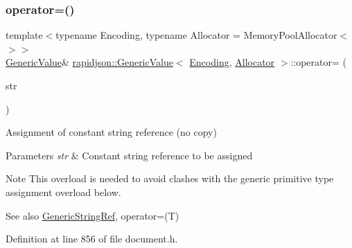 \subsubsection{\texorpdfstring{operator=()}{operator=()}\hspace{0.1cm}{\footnotesize\ttfamily [2/2]}}
{\footnotesize\ttfamily template$<$typename Encoding, typename Allocator = Memory\+Pool\+Allocator$<$$>$$>$ \\
\mbox{\hyperlink{classrapidjson_1_1_generic_value}{Generic\+Value}}\& \mbox{\hyperlink{classrapidjson_1_1_generic_value}{rapidjson\+::\+Generic\+Value}}$<$ \mbox{\hyperlink{classrapidjson_1_1_encoding}{Encoding}}, \mbox{\hyperlink{classrapidjson_1_1_allocator}{Allocator}} $>$\+::operator= (\begin{DoxyParamCaption}\item[{\mbox{\hyperlink{classrapidjson_1_1_generic_value_a559eb9cea54364a35518b02f6d74f379}{String\+Ref\+Type}}}]{str }\end{DoxyParamCaption})}



Assignment of constant string reference (no copy) 


\begin{DoxyParams}{Parameters}
{\em str} & Constant string reference to be assigned \\
\hline
\end{DoxyParams}
\begin{DoxyNote}{Note}
This overload is needed to avoid clashes with the generic primitive type assignment overload below. 
\end{DoxyNote}
\begin{DoxySeeAlso}{See also}
\mbox{\hyperlink{structrapidjson_1_1_generic_string_ref}{Generic\+String\+Ref}}, operator=(\+T) 
\end{DoxySeeAlso}


Definition at line 856 of file document.\+h.


\begin{DoxyCode}{0}

\end{DoxyCode}
\mbox{\label{classrapidjson_1_1_generic_value_a5490b1fdb725744a6defb14ed7c238f0}} 
